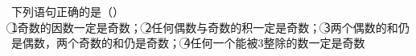 下列语句正确的是（\hspace{4em}）\\
\textcircled{1}奇数的因数一定是奇数；
\textcircled{2}任何偶数与奇数的积一定是奇数；	
\textcircled{3}两个偶数的和仍是偶数，两个奇数的和仍是奇数；
\textcircled{4}任何一个能被$3$整除的数一定是奇数
